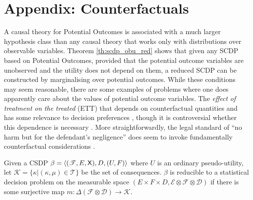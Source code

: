 
\section{Appendix: Counterfactuals}\label{app:counfac}

A causal theory for Potential Outcomes is associated with a much larger hypothesis class than any causal theory that works only with distributions over observable variables. Theorem \ref{th:scdp_obu_red} shows that given any SCDP based on Potential Outcomes, provided that the potential outcome variables are unobserved and the utility does not depend on them, a reduced SCDP can be constructed by marginalising over potential outcomes. While these conditions may seem reasonable, there are some examples of problems where one does apparently care about the values of potential outcome variables. The \emph{effect of treatment on the treated} (ETT) that depends on counterfactual quantities and has some relevance to decision preferences \cite{rubin_estimating_1974}, though it is controversial whether this dependence is necessary \cite{geneletti2007defining}. More straightforwardly, the legal standard of ``no harm but for the defendant's negligence'' does seem to invoke fundamentally counterfactual considerations \cite{pearl_causality:_2009}.

\begin{theorem}\label{th:red_CSDP}
Given a CSDP $\beta=\langle (\mathscr{T},E,\mathsf{X}),D,(U,F)\rangle$ where $U$ is an ordinary pseudo-utility, let $\mathscr{K}=\{\kappa|(\kappa,\mu)\in \mathscr{T}\}$ be the set of consequences. $\beta$ is reducible to a statistical decision problem on the measurable space $(E\times F\times D,\mathcal{E}\otimes \mathcal{F}\otimes \mathcal{D})$ if there is some surjective map $m:\Delta(\mathcal{F}\otimes\mathcal{D})\to \mathscr{K}$.
\end{theorem}

